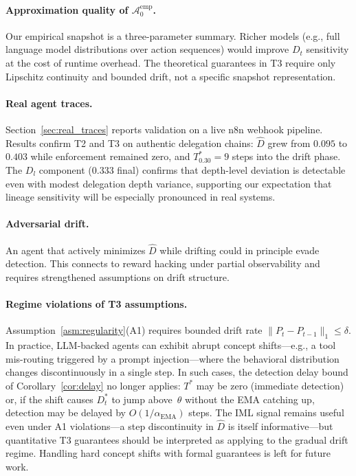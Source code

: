 \documentclass[11pt]{article}
\newcommand{\Azero}{\mathcal{A}_0}
\newcommand{\Dhat}{\widehat{D}}
\begin{document}
\paragraph{Approximation quality of $\Azero^{\mathrm{emp}}$.}
Our empirical snapshot is a three-parameter summary.  Richer models (e.g., full
language model distributions over action sequences) would improve $D_t$
sensitivity at the cost of runtime overhead.  The theoretical guarantees in
T3 require only Lipschitz continuity and bounded drift, not a specific snapshot
representation.

\paragraph{Real agent traces.}
Section~\ref{sec:real_traces} reports validation on a live n8n webhook
pipeline.  Results confirm T2 and T3 on authentic delegation chains:
$\Dhat$ grew from $0.095$ to $0.403$ while enforcement remained zero, and
$T^*_{0.30} = 9$ steps into the drift phase.  The $D_l$ component
($0.333$ final) confirms that depth-level deviation is detectable even with
modest delegation depth variance, supporting our expectation that lineage
sensitivity will be especially pronounced in real systems.

\paragraph{Adversarial drift.}
An agent that actively minimizes $\Dhat$ while drifting could in principle
evade detection.  This connects to reward hacking under partial observability
and requires strengthened assumptions on drift structure.

\paragraph{Regime violations of T3 assumptions.}
Assumption~\ref{asm:regularity}(A1) requires bounded drift rate
$\|P_t - P_{t-1}\|_1 \leq \delta$.  In practice, LLM-backed agents can
exhibit abrupt concept shifts---e.g., a tool mis-routing triggered by a
prompt injection---where the behavioral distribution changes discontinuously
in a single step.  In such cases, the detection delay bound of
Corollary~\ref{cor:delay} no longer applies: $T^*$ may be zero (immediate
detection) or, if the shift causes $D_t^*$ to jump above~$\theta$ without
the EMA catching up, detection may be delayed by $O(1/\alpha_{\mathrm{EMA}})$
steps.  The IML signal remains useful even under A1 violations---a step
discontinuity in $\Dhat$ is itself informative---but quantitative T3 guarantees
should be interpreted as applying to the gradual drift regime.
Handling hard concept shifts with formal guarantees is left for future work.
\end{document}

